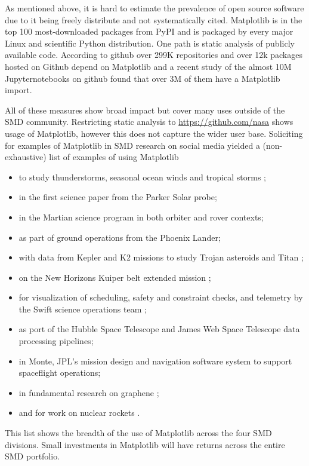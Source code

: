 \documentclass[12pt]{article}
\numberwithin{page}{section}
\begin{document}
As mentioned above, it is hard to estimate the prevalence of open
source software due to it being freely distribute and not
systematically cited.  Matplotlib is in the top 100 most-downloaded
packages from PyPI\cite{pypi_stats} and is packaged by every major
Linux and scientific Python distribution.  One path is static analysis
of publicly available code.  According to github over 299K
repositories and over 12k packages hosted on Github depend on
Matplotlib\cite{gh_deps:2021} and a recent study of the almost 10M
Jupyternotebooks on github found that over 3M of them have a
Matplotlib import\cite{datalore:2020}.

All of these measures show broad impact but cover many uses outside of
the SMD community.  Restricting static analysis to
\url{https://github.com/nasa} shows usage of Matplotlib, however this
does not capture the wider user base.  Soliciting for examples of
Matplotlib in SMD research on social media yielded a (non-exhaustive)
list of examples of using Matplotlib
\begin{itemize}
\item
  to study
  thunderstorms\cite{https://doi.org/10.1002/2016JD025299,https://doi.org/10.1029/2019JD030874},
  seasonal ocean winds \cite{https://doi.org/10.1002/2017JD027516} and
  tropical storms \cite{Lang_2020};
\item in the first science paper from the Parker Solar
  probe\cite{Bale2019};
\item in the Martian science program in both orbiter
  \cite{https://doi.org/10.1029/2019JE006188} and
  rover\cite{https://doi.org/10.1002/2016EA000219} contexts;
\item as part of ground operations from the Phoenix Lander;
\item with data from Kepler and K2 missions to study Trojan
  asteroids\cite{Nixon_2019} and Titan
  \cite{Ryan_2017,2019PASP..131h4505P};
\item on the New Horizons Kuiper belt extended mission
  \cite{Porter_2018};
\item for visualization of scheduling, safety and constraint checks,
  and telemetry by the Swift science operations team
  \cite{swift_ops,2020ApJ...900...35T};
\item as port of the Hubble Space Telescope and James Web Space
  Telescope data processing pipelines;
\item in Monte, JPL's mission design
  and navigation software system to support spaceflight operations;
\item in fundamental research on graphene \cite{PhysRevLett.120.236802};
\item and for work on nuclear rockets \cite{leu_cerment}.
\end{itemize}
This list shows the breadth of the use of Matplotlib across the
four SMD divisions.  Small investments in Matplotlib will have returns
across the entire SMD portfolio.
\end{document}
